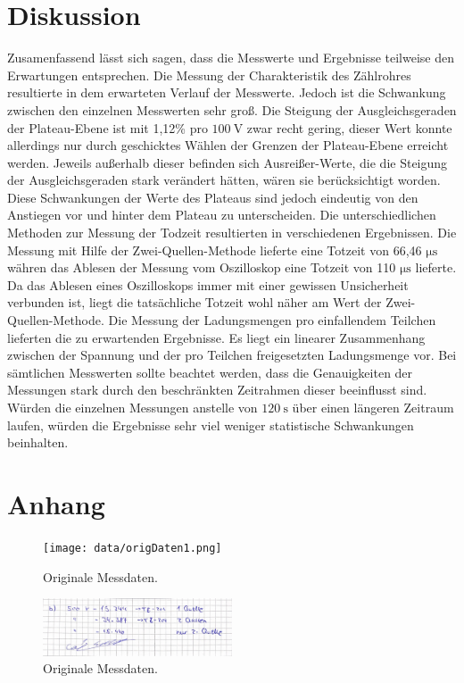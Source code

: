 \section{Diskussion}
\label{sec:Diskussion}

Zusamenfassend lässt sich sagen, dass die Messwerte und Ergebnisse teilweise den Erwartungen entsprechen.
\newline
Die Messung der Charakteristik des Zählrohres resultierte in dem erwarteten Verlauf der Messwerte. Jedoch ist die Schwankung zwischen den einzelnen Messwerten sehr groß.
Die Steigung der Ausgleichsgeraden der Plateau-Ebene ist mit 1,12\% pro $\SI{100}{\volt}$ zwar recht gering, dieser Wert konnte allerdings nur durch geschicktes Wählen der
Grenzen der Plateau-Ebene erreicht werden. Jeweils außerhalb dieser befinden sich Ausreißer-Werte, die die Steigung der Ausgleichsgeraden stark verändert hätten, wären sie
berücksichtigt worden. Diese Schwankungen der Werte des Plateaus sind jedoch eindeutig von den Anstiegen vor und hinter dem Plateau zu unterscheiden.
\newline
Die unterschiedlichen Methoden zur Messung der Todzeit resultierten in verschiedenen Ergebnissen. Die Messung mit Hilfe der Zwei-Quellen-Methode lieferte eine Totzeit von
66,46 $\si{\micro\second}$ währen das Ablesen der Messung vom Oszilloskop eine Totzeit von 110 $\si{\micro\second}$ lieferte. Da das Ablesen eines Oszilloskops immer mit
einer gewissen Unsicherheit verbunden ist, liegt die tatsächliche Totzeit wohl näher am Wert der Zwei-Quellen-Methode.
\newline
Die Messung der Ladungsmengen pro einfallendem Teilchen lieferten die zu erwartenden Ergebnisse. Es liegt ein linearer Zusammenhang zwischen der
Spannung und der pro Teilchen freigesetzten Ladungsmenge vor.
\newline
Bei sämtlichen Messwerten sollte beachtet werden, dass die Genauigkeiten der Messungen stark durch den beschränkten Zeitrahmen dieser beeinflusst sind. Würden die
einzelnen Messungen anstelle von $\SI{120}{\second}$ über einen längeren Zeitraum laufen, würden die Ergebnisse sehr viel weniger statistische Schwankungen beinhalten.

\printbibliography{}

\section*{Anhang}
\label{sec:anhang}

\begin{figure}[H]
    \centering
    \texttt{[image: data/origDaten1.png]}
    \caption{Originale Messdaten.}
    \label{fig:origDaten1}
\end{figure}

\begin{figure}[H]
    \centering
    \includegraphics[width=0.5\textwidth]{data/origDaten2.png}
    \caption{Originale Messdaten.}
    \label{fig:origDaten2}
\end{figure}